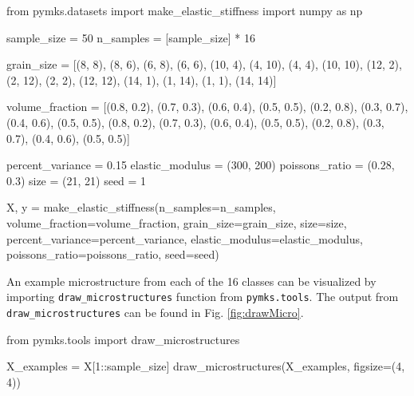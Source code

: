 \documentclass{bmcart}
\begin{document}
\begin{_input}
from pymks.datasets import make_elastic_stiffness
import numpy as np

sample_size = 50
n_samples = [sample_size] * 16

grain_size = [(8, 8), (8, 6), (6, 8), (6, 6),
              (10, 4), (4, 10), (4, 4), (10, 10),
              (12, 2), (2, 12), (2, 2), (12, 12),
              (14, 1), (1, 14), (1, 1), (14, 14)]

volume_fraction = [(0.8, 0.2), (0.7, 0.3), (0.6, 0.4), (0.5, 0.5),
                   (0.2, 0.8), (0.3, 0.7), (0.4, 0.6), (0.5, 0.5),
                   (0.8, 0.2), (0.7, 0.3), (0.6, 0.4), (0.5, 0.5),
                   (0.2, 0.8), (0.3, 0.7), (0.4, 0.6), (0.5, 0.5)]

percent_variance = 0.15
elastic_modulus = (300, 200)
poissons_ratio = (0.28, 0.3)
size = (21, 21)
seed = 1

X, y = make_elastic_stiffness(n_samples=n_samples,
                              volume_fraction=volume_fraction,
                              grain_size=grain_size,  size=size,
                              percent_variance=percent_variance,
                              elastic_modulus=elastic_modulus,
                              poissons_ratio=poissons_ratio,
                              seed=seed)

\end{_input}

    An example microstructure from each of the 16 classes can be
visualized by importing \texttt{draw\_microstructures} function from
\texttt{pymks.tools}. The output from \texttt{draw\_microstructures}
can be found in Fig. \ref{fig:drawMicro}.


\begin{_input}
 from pymks.tools import draw_microstructures

X_examples = X[1::sample_size]
draw_microstructures(X_examples, figsize=(4, 4))

\end{_input}
\end{document}
